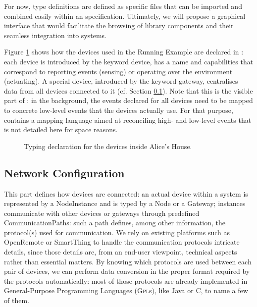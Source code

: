 For now, type definitions are defined as specific files that can be imported and combined easily within an \IOT specification. Ultimately, we will propose a graphical interface that would facilitate the browsing of library components and their seamless integration into \IOT systems.

Figure \ref{fig:RE-Typing} shows how the devices used in the Running Example are declared in \IOTDSL: each device is introduced by the keyword \textsf{device}, has a name and capabilities that correspond to reporting events (\textsf{sensing}) or operating over the environment (\textsf{actuating}). A special device, introduced by the keyword \textsf{gateway}, centralises data from all devices connected to it (cf. Section \ref{sec:IoTDSL-NetworkConfiguration}). Note that this is the visible part of \IOTDSL: in the background, the events declared for all devices need to be mapped to concrete low-level events that the devices actually use. For that purpose, \IOTDSL contains a mapping language aimed at reconciling high- and low-level events that is not detailed here for space reasons.

\begin{figure}[t]%
\caption{Typing declaration for the devices inside Alice's House.}%
\label{fig:RE-Typing}%
\end{figure}	
	
\subsection{Network Configuration}
\label{sec:IoTDSL-NetworkConfiguration}

This part defines how devices are connected: an actual device within a system is represented by a \textsf{NodeInstance} and is typed by a \textsf{Node} or a \textsf{Gateway}; instances communicate with other \IOT devices or gateways through predefined \textsf{CommunicationPath}s: such a path defines, among other information, the protocol(s) used for communication. We rely on existing platforms such as OpenRemote or SmartThing to handle the communication protocols intricate details, since those details are, from an end-user viewpoint, technical aspects rather than essential matters. By knowing which protocols are used between each pair of devices, we can perform data conversion in the proper format required by the protocols automatically: most of those protocols are already implemented in General-Purpose Programming Languages (\textsc{Gpl}s), like Java or C, to name a few of them.
	

